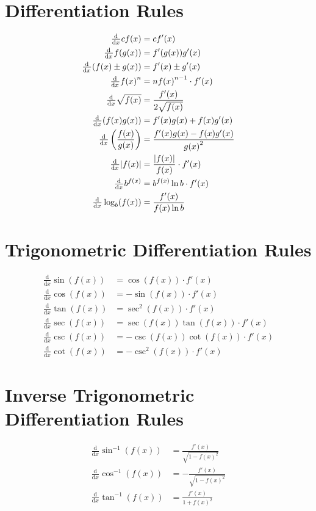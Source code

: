 \documentclass[12pt]{article}
\DeclarePairedDelimiter\abs{\lvert}{\rvert}
\newcommand*{\fixmath}{\makebox{}\vspace{\glueexpr-\baselineskip-\abovedisplayskip}}
\newcommand*{\asin}{\sin^{-1}}
\newcommand*{\acos}{\cos^{-1}}
\newcommand*{\atan}{\tan^{-1}}
\newcommand*{\dd}[3][]{\tfrac{\mathrm{d}^{#1}#2}{\mathrm{d}#3^{#1}}}
\newenvironment{rmskip}{\setlength{\abovedisplayskip}{0pt}%
  \setlength{\belowdisplayskip}{0pt}\fixmath\ignorespaces}%
  {\ignorespacesafterend}
\begin{document}
\section*{Differentiation Rules}
\begin{rmskip}
  \begin{align*}
    \dd{}{x}c f(x) &= c f'(x)\\
    \dd{}{x}f(g(x)) &= f'(g(x))g'(x)\\
    \dd{}{x}(f(x) \pm g(x)) &= f'(x) \pm g'(x)\\
    \dd{}{x}{f(x)}^n &= n{f(x)}^{n-1} \cdot f'(x)\\
    \dd{}{x}\sqrt{f(x)} &= \frac{f'(x)}{2\sqrt{f(x)}}\\
    \dd{}{x}(f(x)g(x)) &= f'(x)g(x) + f(x)g'(x)\\
    \dd{}{x}\left(\frac{f(x)}{g(x)}\right) &= \frac{f'(x)g(x) - f(x)g'(x)}
      {{g(x)}^2}\\
    \dd{}{x}\abs*{f(x)} &= \frac{\abs*{f(x)}}{f(x)} \cdot f'(x)\\
    \dd{}{x}b^{f(x)} &= b^{f(x)} \ln b \cdot f'(x)\\
    \dd{}{x}\log_b(f(x)) &= \frac{f'(x)}{f(x) \ln b}
  \end{align*}
\end{rmskip}
\section*{Trigonometric Differentiation Rules}
\begin{rmskip}
  \begin{align*}
    \dd{}{x}\sin(f(x)) &= \cos(f(x)) \cdot f'(x)\\
    \dd{}{x}\cos(f(x)) &= -\sin(f(x)) \cdot f'(x)\\
    \dd{}{x}\tan(f(x)) &= \sec^2(f(x)) \cdot f'(x)\\
    \dd{}{x}\sec(f(x)) &= \sec(f(x))\tan(f(x)) \cdot f'(x)\\
    \dd{}{x}\csc(f(x)) &= -\csc(f(x))\cot(f(x)) \cdot f'(x)\\
    \dd{}{x}\cot(f(x)) &= -\csc^2(f(x)) \cdot f'(x)
  \end{align*}
\end{rmskip}
\section*{Inverse Trigonometric Differentiation Rules}
\begin{rmskip}
  \begin{align*}
    \dd{}{x}\asin(f(x)) &= \frac{f'(x)}{\sqrt{1 - {f(x)}^2}}\\
    \dd{}{x}\acos(f(x)) &= -\frac{f'(x)}{\sqrt{1 - {f(x)}^2}}\\
    \dd{}{x}\atan(f(x)) &= \frac{f'(x)}{1 + {f(x)}^2}
  \end{align*}
\end{rmskip}
\end{document}
